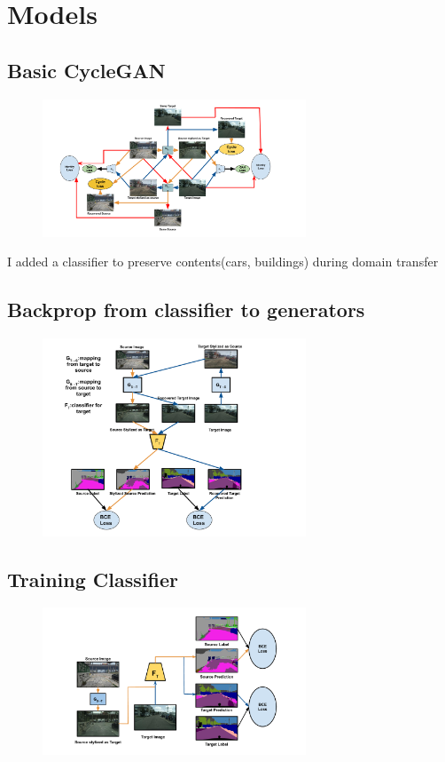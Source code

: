 \documentclass{article}
\begin{document}
\section{Models}
\subsection{Basic CycleGAN}
\begin{figure}[H]
    \centering
\includegraphics[width=0.7\textwidth]{figures/cygan.pdf}
\end{figure}
I added a classifier to preserve contents(cars, buildings) during domain transfer
\subsection{Backprop from classifier to generators}
\begin{figure}[H]
    \centering
\includegraphics[width=0.7\textwidth]{figures/f_g.pdf}
\end{figure}

\subsection{Training Classifier}
\begin{figure}[H]
    \centering
\includegraphics[width=0.7\textwidth]{figures/c_t.pdf}
\end{figure}
\end{document}
